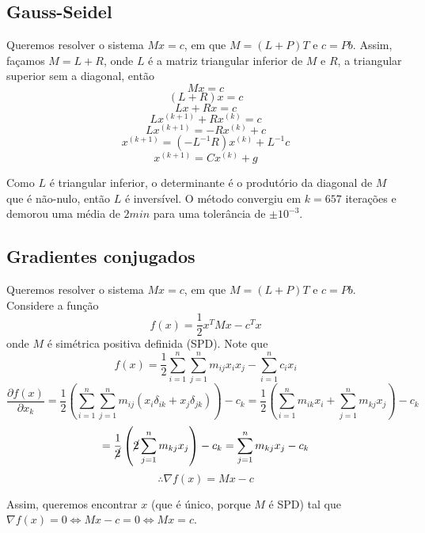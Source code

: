 \documentclass{article}
\begin{document}
    \subsection{Gauss-Seidel}
    Queremos resolver o sistema $Mx = c$, em que $M = (L+P)T$ e $c = Pb$. Assim, façamos $M = L+R$, onde $L$ é a matriz triangular inferior de $M$ e $R$, a triangular superior sem a diagonal, então
    \[Mx = c\]
    \[(L+R)x = c\]
    \[Lx + Rx = c\]
    \[Lx^{(k+1)} + Rx^{(k)} = c\]
    \[Lx^{(k+1)} = - Rx^{(k)} + c\]
    \[x^{(k+1)} = (-L^{-1}R)x^{(k)} + L^{-1}c\]
    \[x^{(k+1)} = Cx^{(k)} + g\]

    Como $L$ é triangular inferior, o determinante é o produtório da diagonal de $M$ que é não-nulo, então $L$ é inversível. O método convergiu em $k = 657$ iterações e demorou uma média de $2 min$ para uma tolerância de $\pm 10^{-3}$.

    \subsection{Gradientes conjugados}
    Queremos resolver o sistema $Mx = c$, em que $M = (L+P)T$ e $c = Pb$. Considere a função
    \[f(x) = \frac{1}{2}x^TMx - c^Tx\]
    onde $M$ é simétrica positiva definida (SPD). Note que
    \[f(x) = \frac{1}{2} \sum_{i=1}^{n}\sum_{j=1}^{n} m_{ij} x_{i} x_{j} - \sum_{i=1}^{n} c_{i} x_{i}\]
    \[\frac{\partial f(x)}{\partial x_k} = \frac{1}{2} \left( \sum_{i=1}^{n}\sum_{j=1}^{n} m_{ij} (x_{i} \delta_{ik} + x_{j} \delta_{jk}) \right) - c_k = \frac{1}{2} \left( \sum_{i=1}^{n} m_{ik} x_{i} + \sum_{j=1}^{n} m_{kj} x_{j} \right) - c_k\]
    \[= \frac{1}{\cancel{2}} \left( \cancel{2} \sum_{j=1}^{n} m_{kj} x_{j} \right) - c_k = \sum_{j=1}^{n} m_{kj} x_{j} - c_k\]
    \[\therefore \nabla f(x) = Mx - c\]

    \newpage

    Assim, queremos encontrar $x$ (que é único, porque $M$ é SPD) tal que $\nabla f(x) = 0 \iff Mx-c = 0 \iff Mx = c$.
\end{document}
